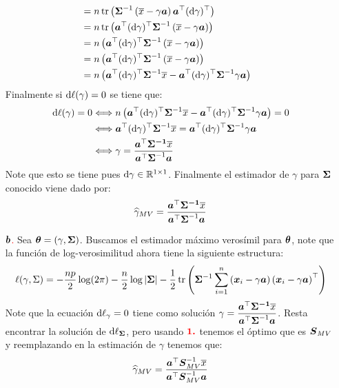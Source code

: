 \begin{itemize}
\begin{align*}
{}\\
&= n \tr\parcurvo{\bf{\Sigma}^{-1}\parcurvo{ \barra{x} - \gamma\bf{a}}\bf{a}^\top (\de \gamma)^\top
}\\
&= n \tr\parcurvo{\bf{a}^\top (\de \gamma)^\top\bf{\Sigma}^{-1}\parcurvo{ \barra{x} - \gamma\bf{a}}
}\\
&= n \parcurvo{\bf{a}^\top (\de \gamma)^\top\bf{\Sigma}^{-1}\parcurvo{ \barra{x} - \gamma\bf{a}}}
\\
&= n \parcurvo{\bf{a}^\top (\de \gamma)^\top\bf{\Sigma}^{-1}\parcurvo{ \barra{x} - \gamma\bf{a}}}
\\
&= n \parcurvo{\bf{a}^\top (\de \gamma)^\top\bf{\Sigma}^{-1} \barra{x} - \bf{a}^\top (\de \gamma)^\top\bf{\Sigma}^{-1}\gamma\bf{a}}\\
\end{align*}
Finalmente si $\de \ell (\gamma) = 0$ se tiene que:
\begin{align*}
\de \ell (\gamma) = 0 &\ssi n \parcurvo{\bf{a}^\top (\de \gamma)^\top\bf{\Sigma}^{-1} \barra{x} - \bf{a}^\top (\de \gamma)^\top\bf{\Sigma}^{-1}\gamma\bf{a}} = 0\\
&\ssi \bf{a}^\top (\de \gamma)^\top\bf{\Sigma}^{-1} \barra{x}=\bf{a}^\top (\de \gamma)^\top\bf{\Sigma}^{-1}\gamma\bf{a}\\
&\ssi \gamma = \dfrac{\bf{a}^\top \bf{\Sigma^{-1}} \barra{x}}{\bf{a}^\top \bf{\Sigma}^{-1} \bf{a}}
\end{align*}
Note que esto se tiene pues $\de \gamma \in \mathbb{R}^{1\times 1}$. Finalmente el estimador de $\gamma$ para $\bf{\Sigma}$ conocido viene dado por:
$$
\gorro{\gamma}_{MV} = \dfrac{\bf{a}^\top \bf{\Sigma^{-1}} \barra{x}}{\bf{a}^\top \bf{\Sigma}^{-1} \bf{a}}
$$
\item[\textcolor{red}{$\bf{b}$.}] Sea $\bf{\theta} = \parcurvo{\gamma,\bf{\Sigma}}$. Buscamos el estimador máximo verosímil para $\bf{\theta}$, note que la función de log-verosimilitud ahora tiene la siguiente estructura:
$$
\ell(\gamma,\Sigma)=-\frac{np}{2}\log(2\pi)-\frac{n}{2} \log |\boldsymbol{\Sigma}|-\frac{1}{2} \operatorname{tr}\left( \boldsymbol{\Sigma}^{-1}\suma \parcurvo{
\bf{x}_i - \gamma\bf{a}
}\parcurvo{
\bf{x}_i - \gamma\bf{a}
}^\top\right)
$$
Note que la ecuación $\de \ell _{\gamma} = 0$ tiene como solución $\gamma = \dfrac{\bf{a}^\top \bf{\Sigma^{-1}} \barra{x}}{\bf{a}^\top \bf{\Sigma}^{-1} \bf{a}}$. Resta encontrar la solución de $\de \ell _{\bf{\Sigma}}$, pero usando $\textcolor{red}{\bf{1.}}$ tenemos el óptimo que es $\bf{S}_{MV}$ y reemplazando en la estimación de $\gamma$ tenemos que:
\begin{align*}
\gorro{\gamma}_{MV} = \dfrac{\bf{a}^\top \bf{S}_{MV}^{-1}\barra{x}}{\bf{a}^\top \bf{S}_{MV}^{-1} \bf{a}}
\end{align*}
\end{itemize}